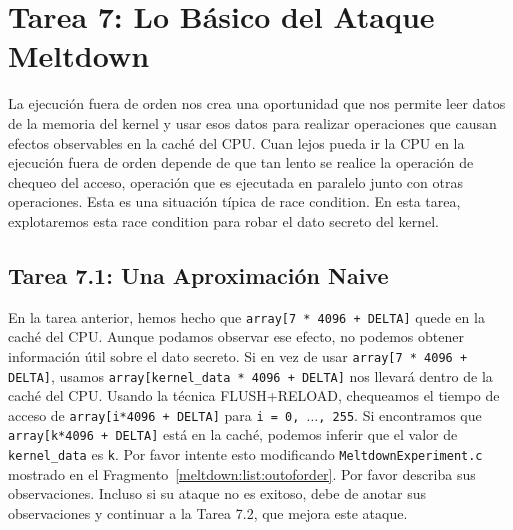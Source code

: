 


\section{Tarea 7: Lo Básico del Ataque Meltdown}

La ejecución fuera de orden nos crea una oportunidad que nos permite leer datos de la memoria del kernel y usar esos datos para realizar operaciones que causan efectos observables en la caché del CPU. Cuan lejos pueda ir la CPU en la ejecución fuera de orden depende de que tan lento se realice la operación de chequeo del acceso, operación que es ejecutada en paralelo junto con otras operaciones. Esta es una situación típica de race condition. En esta tarea, explotaremos esta race condition para robar el dato secreto del kernel.


\subsection{Tarea 7.1: Una Aproximación Naive}

En la tarea anterior, hemos hecho que \texttt{array[7 * 4096 + DELTA]} quede en la caché del CPU.
Aunque podamos observar ese efecto, no podemos obtener información útil sobre el dato secreto. Si en vez de usar \texttt{array[7 * 4096 + DELTA]}, usamos \texttt{array[kernel\_data * 4096 + DELTA]} nos llevará dentro de la caché del CPU.
Usando la técnica FLUSH+RELOAD, chequeamos el tiempo de acceso de \texttt{array[i*4096 + DELTA]} para \texttt{i = 0, $\ldots$, 255}. 
Si encontramos que \texttt{array[k*4096 + DELTA]} está en la caché, podemos inferir que el valor de \texttt{kernel\_data} es \texttt{k}.
Por favor intente esto modificando \texttt{MeltdownExperiment.c} mostrado en el Fragmento~\ref{meltdown:list:outoforder}. Por favor describa sus observaciones.
Incluso si su ataque no es exitoso, debe de anotar sus observaciones y continuar a la Tarea 7.2, que mejora este ataque.


